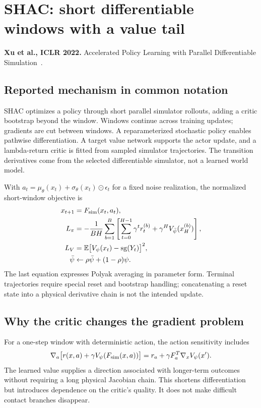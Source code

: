 \section{SHAC: short differentiable windows with a value tail}\label{sec:shac}
\textbf{Xu et al., ICLR 2022.} Accelerated Policy Learning with Parallel
Differentiable Simulation~\cite{shac}.

\subsection{Reported mechanism in common notation}
SHAC optimizes a policy through short parallel simulator rollouts, adding a
critic bootstrap beyond the window. Windows continue across training updates;
gradients are cut between windows. A reparameterized stochastic policy enables
pathwise differentiation. A target value network supports the actor update,
and a lambda-return critic is fitted from sampled simulator trajectories.
The transition derivatives come from the selected differentiable simulator,
not a learned world model.

With $a_t=\mu_\theta(x_t)+\sigma_\theta(x_t)\odot\epsilon_t$ for a fixed noise
realization, the normalized short-window objective is
\begin{align}
x_{t+1}&=F_{\mathrm{sim}}(x_t,a_t),\\
L_\pi&=-\frac1{BH}\sum_{b=1}^B\left[
\sum_{t=0}^{H-1}\gamma^t r_t^{(b)}+\gamma^HV_{\bar\psi}(x_H^{(b)})\right],\\
L_V&=\mathbb E\big[V_\psi(x_t)-\operatorname{sg}(Y_t)\big]^2,\\
\bar\psi&\leftarrow\rho\bar\psi+(1-\rho)\psi.
\end{align}
The last equation expresses Polyak averaging in parameter form. Terminal
trajectories require special reset and bootstrap handling; concatenating a reset
state into a physical derivative chain is not the intended update.

\subsection{Why the critic changes the gradient problem}
For a one-step window with deterministic action, the action sensitivity includes
\begin{equation}
\nabla_a\big[r(x,a)+\gamma V_\psi(F_{\mathrm{sim}}(x,a))\big]
=r_a+\gamma F_a^T\nabla_xV_\psi(x').
\end{equation}
The learned value supplies a direction associated with longer-term outcomes
without requiring a long physical Jacobian chain. This shortens differentiation
but introduces dependence on the critic's quality. It does not make difficult
contact branches disappear.

